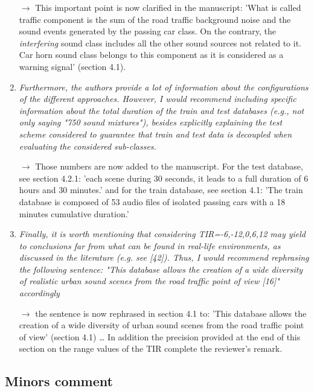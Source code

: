 \documentclass[10pt]{article}
\begin{document}
\begin{enumerate}
$\rightarrow$ This important point is now clarified in the manuscript: 'What is called traffic component is the sum of the road traffic background noise and the sound events generated by the passing car class. On the contrary, the \textit{interfering} sound class includes all the other sound sources not related to it. Car horn sound class belongs to this component as it is considered as a warning signal' (section 4.1).


\item \emph{Furthermore, the authors provide a lot of information about the configurations of the different approaches. However, I would recommend including specific information about the total duration of the train and test databases (e.g., not only saying "750 sound mixtures"), besides explicitly explaining the test scheme considered to guarantee that train and test data is decoupled when evaluating the considered sub-classes.}

$\rightarrow$ Those numbers are now added to the manuscript. For the test database, see section 4.2.1: 'each scene during 30 seconds, it leads to a full duration of 6 hours and 30 minutes.' and for the train database, see section 4.1: 'The train database is composed of 53 audio files of isolated passing cars with a 18 minutes cumulative duration.'

\item \emph{Finally, it is worth mentioning that considering TIR={-6,-12,0,6,12} may yield to conclusions far from what can be found in real-life environments, as discussed in the literature (e.g. see [42]). Thus, I would recommend rephrasing the following sentence: "This database allows the creation of a wide diversity of realistic urban sound scenes from the road traffic point of view [16]" accordingly}

$\rightarrow$ the sentence is now rephrased in section 4.1 to: 'This database allows the creation of a wide diversity of urban sound scenes from the road traffic point of view' (section 4.1) \dots 
In addition the precision provided at the end of this section on the range values of the TIR complete the reviewer's remark.

\end{enumerate}

\subsection{Minors comment}
\end{document}
